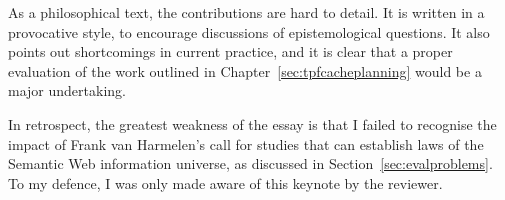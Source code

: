 As a philosophical text, the contributions are hard to detail. It is
written in a provocative style, to encourage discussions of
epistemological questions. It also points out shortcomings in current
practice, and it is clear that a proper evaluation of the work
outlined in Chapter~\ref{sec:tpfcacheplanning} would be a major
undertaking. 

In retrospect, the greatest weakness of the essay is that I failed to
recognise the impact of Frank van Harmelen's call for studies that can
establish laws of the Semantic Web information universe, as discussed
in Section~\ref{sec:evalproblems}. To my defence, I was only made
aware of this keynote by the reviewer.
